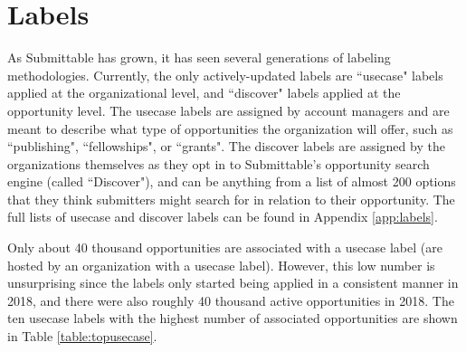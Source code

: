 \documentclass[]{report}   %
\begin{document}
\section{Labels}
As Submittable has grown, it has seen several generations of labeling methodologies. Currently, the only actively-updated labels are ``usecase" labels applied at the organizational level, and ``discover" labels applied at the opportunity level. The usecase labels are assigned by account managers and are meant to describe what type of opportunities the organization will offer, such as ``publishing", ``fellowships", or ``grants". The discover labels are assigned by the organizations themselves as they opt in to Submittable's opportunity search engine (called ``Discover"), and can be anything from a list of almost 200 options that they think submitters might search for in relation to their opportunity. The full lists of usecase and discover labels can be found in Appendix \ref{app:labels}.

Only about 40 thousand opportunities are associated with a usecase label (are hosted by an organization with a usecase label). However, this low number is unsurprising since the labels only started being applied in a consistent manner in 2018, and there were also roughly 40 thousand active opportunities in 2018. The ten usecase labels with the highest number of associated opportunities are shown in Table \ref{table:topusecase}.  
\end{document}
